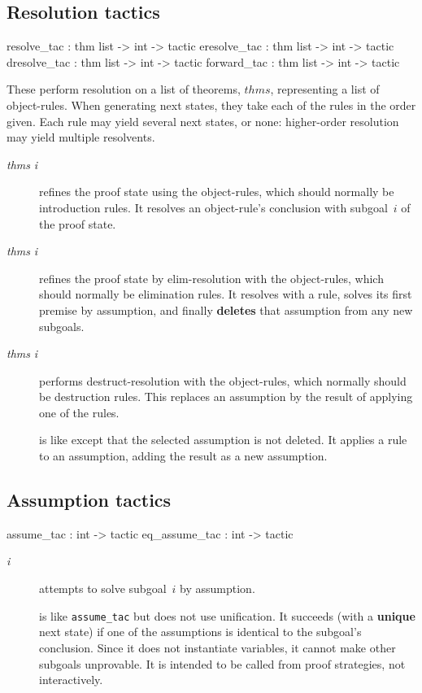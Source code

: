 \subsection{Resolution tactics}
\begin{ttbox} 
resolve_tac  : thm list -> int -> tactic
eresolve_tac : thm list -> int -> tactic
dresolve_tac : thm list -> int -> tactic
forward_tac  : thm list -> int -> tactic 
\end{ttbox}
These perform resolution on a list of theorems, $thms$, representing a list
of object-rules.  When generating next states, they take each of the rules
in the order given.  Each rule may yield several next states, or none:
higher-order resolution may yield multiple resolvents.
\begin{description}
\item[ {\it thms} {\it i}] 
refines the proof state using the object-rules, which should normally be
introduction rules.  It resolves an object-rule's conclusion with
subgoal~$i$ of the proof state.

\item[ {\it thms} {\it i}] 
refines the proof state by elim-resolution with the object-rules, which
should normally be elimination rules.  It resolves with a rule, solves
its first premise by assumption, and finally {\bf deletes} that assumption
from any new subgoals.

\item[ {\it thms} {\it i}] 
performs destruct-resolution with the object-rules, which normally should
be destruction rules.  This replaces an assumption by the result of
applying one of the rules.

\item[] 
is like  except that the selected assumption is not
deleted.  It applies a rule to an assumption, adding the result as a new
assumption.
\end{description}

\subsection{Assumption tactics}
\begin{ttbox} 
assume_tac    : int -> tactic
eq_assume_tac : int -> tactic
\end{ttbox} 
\begin{description}
\item[ {\it i}] 
attempts to solve subgoal~$i$ by assumption.

\item[] 
is like {\tt assume_tac} but does not use unification.  It succeeds (with a
{\bf unique} next state) if one of the assumptions is identical to the
subgoal's conclusion.  Since it does not instantiate variables, it cannot
make other subgoals unprovable.  It is intended to be called from proof
strategies, not interactively.
\end{description}

